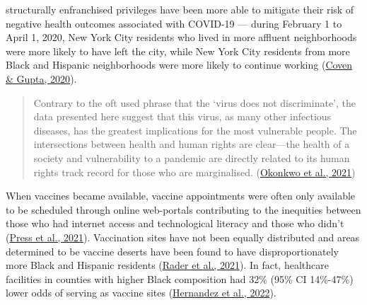 \documentclass[
]{article}
\begin{document}
structurally enfranchised privileges have been more able to mitigate their risk
of negative health outcomes associated with COVID-19 --- during February 1 to
April 1, 2020, New York City residents who lived in more affluent neighborhoods
were more likely to have left the city, while New York City residents from more
Black and Hispanic
neighborhoods were more likely to continue working (\protect\hyperlink{ref-coven_disparities_2020}{Coven \& Gupta, 2020}).

\begin{quote}
Contrary to the oft used phrase that the `virus does not discriminate', the
data presented here suggest that this virus, as many other infectious diseases,
has the greatest implications for the most vulnerable people. The intersections
between health and human rights are clear---the health of a society and
vulnerability to a pandemic are directly related to its human rights track
record for those who are marginalised. (\protect\hyperlink{ref-okonkwo_covid-19_2021}{Okonkwo et al., 2021})
\end{quote}

When vaccines became available, vaccine appointments were often only available
to be scheduled through online web-portals contributing to the inequities
between those who had internet access and technological literacy and those who
didn't (\protect\hyperlink{ref-press_inequities_2021}{Press et al., 2021}). Vaccination sites have not been equally
distributed and areas determined to be vaccine deserts have been found to have
disproportionately more Black and Hispanic residents (\protect\hyperlink{ref-rader_spatial_2021}{Rader et al., 2021}). In
fact, healthcare facilities in counties with higher Black composition had 32\%
(95\% CI 14\%-47\%) lower odds of serving as vaccine sites
(\protect\hyperlink{ref-hernandez_disparities_2022}{Hernandez et al., 2022}).
\end{document}
